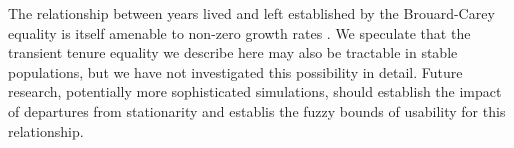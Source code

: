\documentclass[12pt,oneside,a4paper]{article}
\theoremstyle{definition}
\begin{document}
The relationship between years lived
and left established by the Brouard-Carey equality is itself amenable to non-zero growth rates \citep{riffe2015renewal}.
We speculate that the transient tenure equality we describe here may also be tractable in stable
populations, but we have not investigated this possibility in detail. Future
research, potentially more sophisticated simulations, should establish the
impact of departures from stationarity and establis the fuzzy bounds of
usability for this relationship.



%

  
\end{document}
